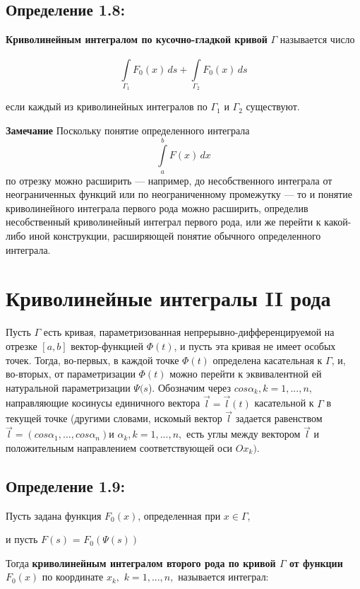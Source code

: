 \documentclass[12pt, english]{article}
\begin{document}
	
\subsection*{Определение 1.8:}	
\textbf{Криволинейным интегралом по кусочно-гладкой кривой} $\Gamma$ называется число

\begin{equation}\label{eq1}
\int\limits_{\Gamma_1}^{} F_0(x)\,ds  + \int\limits_{\Gamma_2}^{} F_0(x)\,ds
\end{equation}

если каждый из криволинейных интегралов по $\Gamma_1$ и $\Gamma_2$ существуют.
	
	
\textbf{Замечание} Поскольку понятие определенного интеграла
 $$\int\limits_{a}^{b} F(x)\,dx $$
по отрезку можно расширить — например, до несобственного интеграла от
неограниченных функций или по неограниченному промежутку — то и понятие криволинейного интеграла первого рода можно расширить, определив несобственный криволинейный интеграл первого рода, или же перейти
к какой-либо иной конструкции, расширяющей понятие обычного определенного интеграла.	
	\newpage	
	
\section{Криволинейные интегралы II рода}	
Пусть $\Gamma$ есть кривая, параметризованная непрерывно-дифференцируемой
на отрезке $[a, b]$ вектор-функцией $\Phi(t)$, и пусть эта кривая не имеет особых
точек. Тогда, во-первых, в каждой точке $\Phi(t)$ определена касательная к  $\Gamma$,
и, во-вторых, от параметризации $\Phi(t)$ можно перейти к эквивалентной ей
натуральной параметризации $\Psi(s$). Обозначим через $cos \alpha_k, k = 1,...,n,$
направляющие косинусы единичного вектора $\vec{l} = \vec{l}(t)$ касательной к $\Gamma$ в
текущей точке (другими словами, искомый вектор $\vec{l}$ задается равенством 
$\vec{l} = (cos \alpha_1,..., cos \alpha_n) $и $\alpha_k, k = 1,...,n,$ есть углы между вектором $\vec{l}$
и положительным направлением соответствующей оси $Ox_k)$. 

\subsection*{Определение 1.9:}	
	Пусть задана функция $F_0(x)$, определенная при $x \in \Gamma$, 

и пусть $ F(s)$ = $F_0(\Psi(s))$

Тогда \textbf{криволинейным интегралом второго рода по кривой $\Gamma$ от функции $F_0(x)$} по координате $x_k,$ $ k = 1,...,n,$ называется интеграл:
\end{document}
